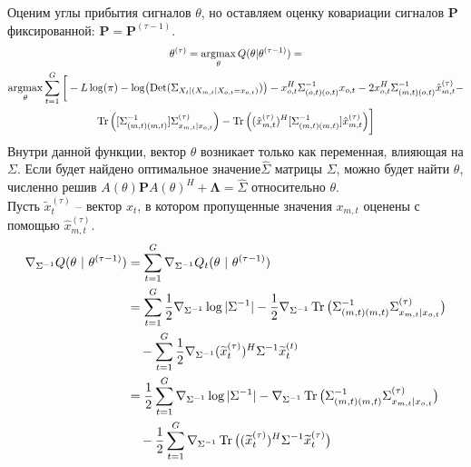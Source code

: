 \documentclass[11pt]{article}
\DeclareMathOperator*{\argmax}{argmax}
\DeclareMathOperator{\Det}{Det}
\begin{document}
\begin{center}
\fontsize{14}{18}\selectfont {}
\end{center}
Оценим углы прибытия сигналов $\theta$, но оставляем оценку ковариации сигналов $\mathbf{P}$ фиксированной: $\mathbf{P} = \mathbf{P}^{(\tau-1)}$.
\begin{equation*}
\begin{gathered}
\theta^{(\tau)}= \argmax_{\theta} Q(\theta | \theta^{(\tau-1)}) = \\
\argmax_{\theta} \sum_{t=1}^G \bigg[-L \log(\pi) - \log (\Det(\Sigma_{X_t|(X_{m,t}|X_{o,t}=x_{o,t})})) - x_{o,t}^H \Sigma_{(o,t)(o,t)}^{-1}x_{o,t} - 2 x_{o,t}^H \Sigma_{(m,t)(o,t)}^{-1}\hat{x}_{m,t}^{(\tau)} - \\ \Tr \Big( [\Sigma_{(m,t)(m,t)}^{-1}]\Sigma^{(\tau)}_{x_{m,t}|x_{o,t}} \Big) - \Tr \Big((\hat{x}_{m,t}^{(\tau)})^H[\Sigma_{(m,t)(m,t)}^{-1}]\hat{x}_{m,t}^{(\tau)} \Big) \bigg]
\end{gathered}
\end{equation*}
Внутри данной функции, вектор $\theta$ возникает только как переменная, влияющая на $\Sigma$. Если будет найдено оптимальное значение$\hat{\Sigma}$ матрицы $\Sigma$, можно будет найти $\theta$, 
численно решив $A(\theta) \mathbf{P}A(\theta)^H + \mathbf{\Lambda} = \hat{\Sigma}$ относительно $\theta$. \\
Пусть $\widetilde{x}_t^{(\tau)}$ -- вектор $x_t$, в котором пропущенные значения $x_{m,t}$ оценены с помощью $\hat{x}_{m,t}^{(\tau)}$.
\begin{align*}
\nabla_{\Sigma^{-1}} Q(\theta \text{ | } \theta^{(\tau-1)}) &= \sum_{t = 1}^{G} \nabla_{\Sigma^{-1}} Q_t (\theta \text{ | } \theta^{(\tau-1)}) \\
&= \sum_{t = 1}^{G} \frac{1}{2} \nabla_{\Sigma^{-1}} \log |\Sigma^{-1}| - \frac{1}{2} \nabla_{\Sigma^{-1}} \Tr \big( \Sigma_{(m,t)(m,t)}^{-1} \Sigma^{(\tau)}_{x_{m,t}|x_{o,t}} \big) \\
&\hspace{10pt} - \sum_{t = 1}^{G} \frac{1}{2} \nabla_{\Sigma^{-1}} (\widetilde{x}_t^{(\tau)})^H \Sigma^{-1} \widetilde{x}_t^{(t)} \\
&= \frac{1}{2} \sum_{t = 1}^{G} \nabla_{\Sigma^{-1}} \log |\Sigma^{-1}| - \nabla_{\Sigma^{-1}} \Tr \big( \Sigma_{(m,t)(m,t)}^{-1} \Sigma^{(\tau)}_{x_{m,t}|x_{o,t}} \big) \\
&\hspace{10pt} - \frac{1}{2} \sum_{t = 1}^{G} \nabla_{\Sigma^{-1}} \Tr \big( (\widetilde{x}_t^{(\tau)})^H \Sigma^{-1} \widetilde{x}_t^{(\tau)} \big)
\end{align*}
\end{document}
